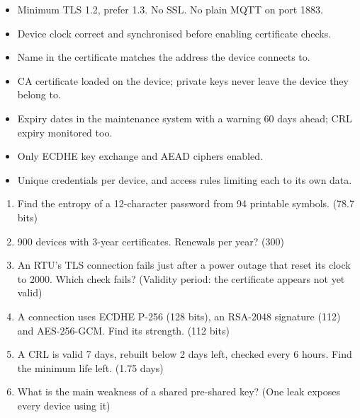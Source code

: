 \begin{itemize}
\item Minimum TLS 1.2, prefer 1.3. No SSL. No plain MQTT on port 1883.
\item Device clock correct and synchronised before enabling certificate checks.
\item Name in the certificate matches the address the device connects to.
\item CA certificate loaded on the device; private keys never leave the device they belong to.
\item Expiry dates in the maintenance system with a warning 60 days ahead; CRL expiry monitored too.
\item Only ECDHE key exchange and AEAD ciphers enabled.
\item Unique credentials per device, and access rules limiting each to its own data.
\end{itemize}

\begin{enumerate}
\item Find the entropy of a 12-character password from 94 printable symbols. (78.7 bits)
\item 900 devices with 3-year certificates. Renewals per year? (300)
\item An RTU's TLS connection fails just after a power outage that reset its clock to 2000. Which check fails? (Validity period: the certificate appears not yet valid)
\item A connection uses ECDHE P-256 (128 bits), an RSA-2048 signature (112) and AES-256-GCM. Find its strength. (112 bits)
\item A CRL is valid 7 days, rebuilt below 2 days left, checked every 6 hours. Find the minimum life left. (1.75 days)
\item What is the main weakness of a shared pre-shared key? (One leak exposes every device using it)
\end{enumerate}
